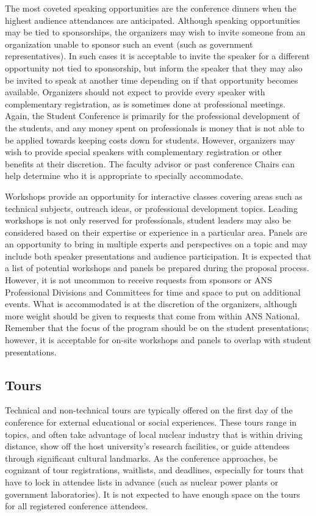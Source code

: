 \documentclass[12pt]{article}
\begin{document}
The most coveted speaking opportunities are the conference dinners when the highest audience attendances are anticipated.
Although speaking opportunities may be tied to sponsorships, the organizers may wish to invite someone from an organization unable to sponsor such an event (such as government representatives).
In such cases it is acceptable to invite the speaker for a different opportunity not tied to sponsorship, but inform the speaker that they may also be invited to speak at another time depending on if that opportunity becomes available.
Organizers should not expect to provide every speaker with complementary registration, as is sometimes done at professional meetings.
Again, the Student Conference is primarily for the professional development of the students, and any money spent on professionals is money that is not able to be applied towards keeping costs down for students.
However, organizers may wish to provide special speakers with complementary registration or other benefits at their discretion.
The faculty advisor or past conference Chairs can help determine who it is appropriate to specially accommodate.

Workshops provide an opportunity for interactive classes covering areas such as technical subjects, outreach ideas, or professional development topics.
Leading workshops is not only reserved for professionals, student leaders may also be considered based on their expertise or experience in a particular area.
Panels are an opportunity to bring in multiple experts and perspectives on a topic and may include both speaker presentations and audience participation.
It is expected that a list of potential workshops and panels be prepared during the proposal process.
However, it is not uncommon to receive requests from sponsors or ANS Professional Divisions and Committees for time and space to put on additional events.
What is accommodated is at the discretion of the organizers, although more weight should be given to requests that come from within ANS National.
Remember that the focus of the program should be on the student presentations; however, it is acceptable for on-site workshops and panels to overlap with student presentations.

\subsection{Tours}
Technical and non-technical tours are typically offered on the first day of the conference for external educational or social experiences.
These tours range in topics, and often take advantage of local nuclear industry that is within driving distance, show off the host university’s research facilities, or guide attendees through significant cultural landmarks.
As the conference approaches, be cognizant of tour registrations, waitlists, and deadlines, especially for tours that have to lock in attendee lists in advance (such as nuclear power plants or government laboratories).
It is not expected to have enough space on the tours for all registered conference attendees.
\end{document}
